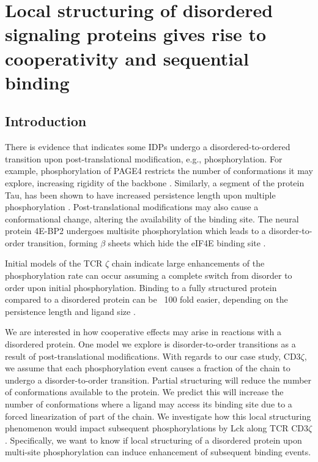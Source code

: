 \documentclass[../../AdvancementSummary.tex]{subfiles}
\begin{document}
\section{Local structuring of disordered signaling proteins gives rise to cooperativity and sequential binding}
\label{sec:LocalStruct}


\subsection{Introduction}


There is evidence that indicates some IDPs undergo a disordered-to-ordered transition upon post-translational modification, e.g., phosphorylation. For example, phosphorylation of PAGE4 restricts the number of conformations it may explore, increasing rigidity of the backbone \cite{He2015}. Similarly, a segment of the protein Tau, has been shown to have increased persistence length upon multiple phosphorylation \cite{Chin2016}. Post-translational modifications may also cause a conformational change, altering the availability of the binding site. The neural protein 4E-BP2 undergoes multisite phosphorylation which leads to a disorder-to-order transition, forming $\beta$ sheets which hide the eIF4E binding site \cite{Bah2015}. 

Initial models of the TCR $\zeta$ chain indicate large enhancements of the phosphorylation rate can occur assuming a complete switch from disorder to order upon initial phosphorylation. Binding to a fully structured protein compared to a disordered protein can be ~100 fold easier, depending on the persistence length and ligand size \cite{Mukhopadhyay2016}.


We are interested in how cooperative effects may arise in reactions with a disordered protein. One model we explore is disorder-to-order transitions as a result of post-translational modifications. With regards to our case study, CD3$\zeta$, we assume that each phosphorylation event causes a fraction of the chain to undergo a disorder-to-order transition. Partial structuring will reduce the number of conformations available to the protein. We predict this will increase the number of conformations where a ligand may access its binding site due to a forced linearization of part of the chain. We investigate how this local structuring phenomenon would impact subsequent phosphorylations by Lck along TCR CD3$\zeta$. Specifically, we want to know if local structuring of a disordered protein upon multi-site phosphorylation can induce enhancement of subsequent binding events.
\end{document}
